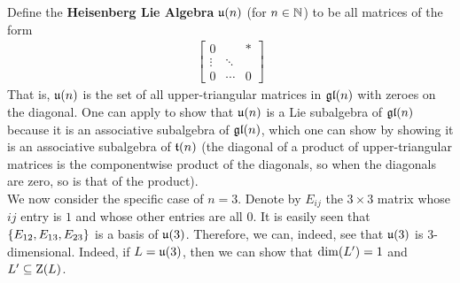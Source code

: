 \begin{boxexample}\label{Ch1:Eg:Heisenberg_Lie_Algebra}
    Define the \textbf{Heisenberg Lie Algebra} $\mathfrak{u}\!\left( n \right)$ (for $n \in \mathbb{N}$) to be all matrices of the form
    \begin{align*}
        \begin{bmatrix}
            0 & & * \\
            \vdots & \ddots & \\
            0 & \cdots & 0
        \end{bmatrix}
    \end{align*}
    That is, $\mathfrak{u}\!\left( n \right)$ is the set of all upper-triangular matrices in $\mathfrak{gl}\!\left( n \right)$ with zeroes on the diagonal. One can apply  to show that $\mathfrak{u}\!\left( n \right)$ is a Lie subalgebra of $\mathfrak{gl}\!\left( n \right)$ because it is an associative subalgebra of $\mathfrak{gl}\!\left( n \right)$, which one can show by showing it is an associative subalgebra of $\mathfrak{t}\!\left( n \right)$ (the diagonal of a product of upper-triangular matrices is the componentwise product of the diagonals, so when the diagonals are zero, so is that of the product). \\

    We now consider the specific case of $n = 3$. Denote by $E_{ij}$ the $3 \times 3$ matrix whose $ij$ entry is $1$ and whose other entries are all $0$. It is easily seen that $\left\{ E_{12}, E_{13}, E_{23} \right\}$ is a basis of $\mathfrak{u}\!\left( 3 \right)$. Therefore, we can, indeed, see that $\mathfrak{u}\!\left( 3 \right)$ is $3$-dimensional. Indeed, if $L = \mathfrak{u}\!\left( 3 \right)$, then we can show that $\dim\!\left( L' \right) = 1$ and $L' \subseteq \operatorname{Z}\!\left( L \right)$. \\
    

\end{boxexample}
